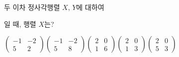 두 이차 정사각행렬 $X$, $Y$에 대하여 \par\smallskip{}\par\smallskip\noindent 일 때, 행렬 $X$는?
\begin{choices32}{$\begin{pmatrix} -1 & -2 \\ 5 & 2 \end{pmatrix}$}{$\begin{pmatrix} -1 & -2 \\ 5 & 8 \end{pmatrix}$}{$\begin{pmatrix} 2 & 0 \\ 1 & 6 \end{pmatrix}$}{$\begin{pmatrix} 2 & 0 \\ 1 & 3 \end{pmatrix}$}{$\begin{pmatrix} 2 & 0 \\ 5 & 3 \end{pmatrix}$}\end{choices32}
